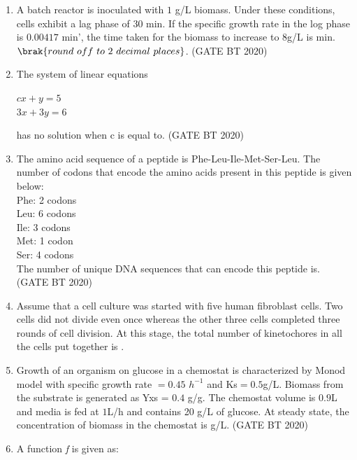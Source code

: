 \documentclass[journal,12pt,onecolumn]{IEEEtran}
\theoremstyle{remark}
\begin{document}
\begin{enumerate}[label=Q\arabic*:, start=26, leftmargin=2em]
\item A batch reactor is inoculated with $1$ g/L biomass. Under these conditions, cells exhibit a lag phase of $30$ min. If the specific growth rate in the log phase is $0.00417$ min', the time taken for the biomass to increase to $ 8 $g/L is min.\\
$\brak{round \ off \ to \ 2 \ decimal\ places}$. \hfill(GATE BT 2020)

\item The system of linear equations\\
\begin{center}
$cx+y=5$\\
$3x+3y=6$\\
\end{center}
has no solution when c is equal to. \hfill(GATE BT 2020)

\item The amino acid sequence of a peptide is Phe-Leu-Ile-Met-Ser-Leu. The number of codons that encode the amino acids present in this peptide is given below:\\
Phe: 2 codons\\
Leu: 6 codons\\
Ile: 3 codons\\
Met: 1 codon\\
Ser: 4 codons\\

The number of unique DNA sequences that can encode this peptide is. \hfill(GATE BT 2020)\\


\item Assume that a cell culture was started with five human fibroblast cells. Two cells did not divide even once whereas the other three cells completed three rounds of cell division. At this stage, the total number of kinetochores in all the cells put together is . \hfill\brak{[GATE 2020-BT]}\\

\item Growth of an organism on glucose in a chemostat is characterized by Monod model with specific growth rate $= 0.45$ $h^{-1}$ and Ks$ = 0.5 $g/L. Biomass from the substrate is generated as Yxs = $0.4$ g/g. The chemostat volume is $0.9 $L and media is fed at $1 $L/h and contains 20 g/L of glucose. At steady state, the concentration of biomass in the chemostat is g/L. \hfill(GATE BT 2020)\\

\item A function \textit{f} is given as:\\


\end{enumerate}
\end{document}
